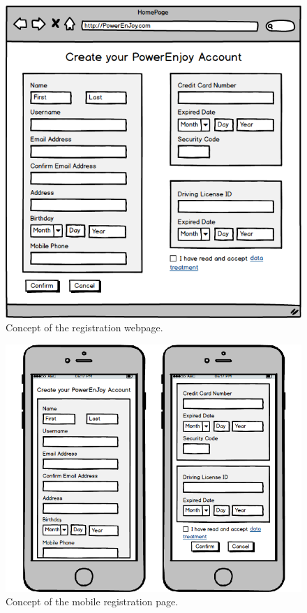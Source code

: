 \begin{figure}[H]
	\centering
	\includegraphics[width=\textwidth]{mockup/WebRegistration.png}
	\caption{Concept of the registration webpage.}
\end{figure}

\begin{figure}[H]
	\centering
	\includegraphics[width=\textwidth]{mockup/MobileRegistration.png}
	\caption{Concept of the mobile registration page.}
\end{figure}

